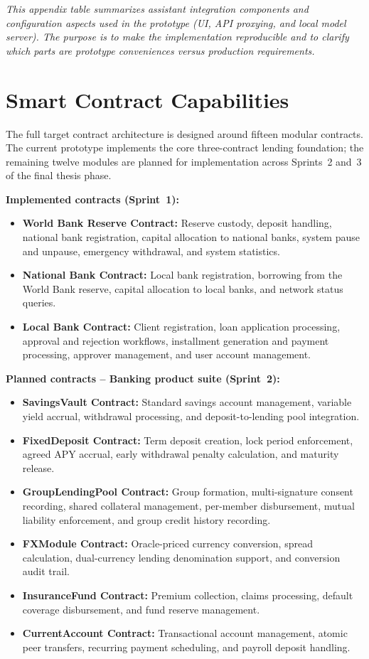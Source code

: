 \documentclass[12pt,a4paper]{report}
\begin{document}
\vspace{2pt}
\noindent\textit{\small This appendix table summarizes assistant integration components and configuration aspects used in the prototype (UI, API proxying, and local model server). The purpose is to make the implementation reproducible and to clarify which parts are prototype conveniences versus production requirements.}

\chapter{Smart Contract Capabilities}

The full target contract architecture is designed around fifteen modular contracts. The current prototype implements the core three-contract lending foundation; the remaining twelve modules are planned for implementation across Sprints~2 and~3 of the final thesis phase.

\textbf{Implemented contracts (Sprint~1):}
\begin{itemize}[noitemsep]
\item \textbf{World Bank Reserve Contract:} Reserve custody, deposit handling, national bank registration, capital allocation to national banks, system pause and unpause, emergency withdrawal, and system statistics.
\item \textbf{National Bank Contract:} Local bank registration, borrowing from the World Bank reserve, capital allocation to local banks, and network status queries.
\item \textbf{Local Bank Contract:} Client registration, loan application processing, approval and rejection workflows, installment generation and payment processing, approver management, and user account management.
\end{itemize}

\textbf{Planned contracts -- Banking product suite (Sprint~2):}
\begin{itemize}[noitemsep]
\item \textbf{SavingsVault Contract:} Standard savings account management, variable yield accrual, withdrawal processing, and deposit-to-lending pool integration.
\item \textbf{FixedDeposit Contract:} Term deposit creation, lock period enforcement, agreed APY accrual, early withdrawal penalty calculation, and maturity release.
\item \textbf{GroupLendingPool Contract:} Group formation, multi-signature consent recording, shared collateral management, per-member disbursement, mutual liability enforcement, and group credit history recording.
\item \textbf{FXModule Contract:} Oracle-priced currency conversion, spread calculation, dual-currency lending denomination support, and conversion audit trail.
\item \textbf{InsuranceFund Contract:} Premium collection, claims processing, default coverage disbursement, and fund reserve management.
\item \textbf{CurrentAccount Contract:} Transactional account management, atomic peer transfers, recurring payment scheduling, and payroll deposit handling.
\end{itemize}
\end{document}
